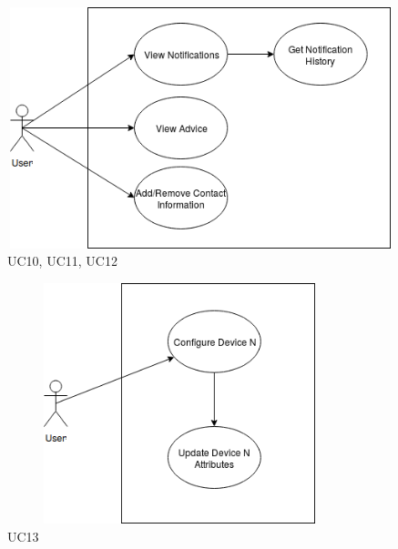 \begin{figure}[!htb]
	\includegraphics[width=15cm, height=7cm]{Diagrams/UseCase101112.png}
	\caption{UC10, UC11, UC12}
\end{figure}

\pagebreak

\begin{figure}[!htb]
	\includegraphics[width=10cm, height=7cm]{Diagrams/UseCase13.png}
	\caption{UC13}
\end{figure}

\pagebreak